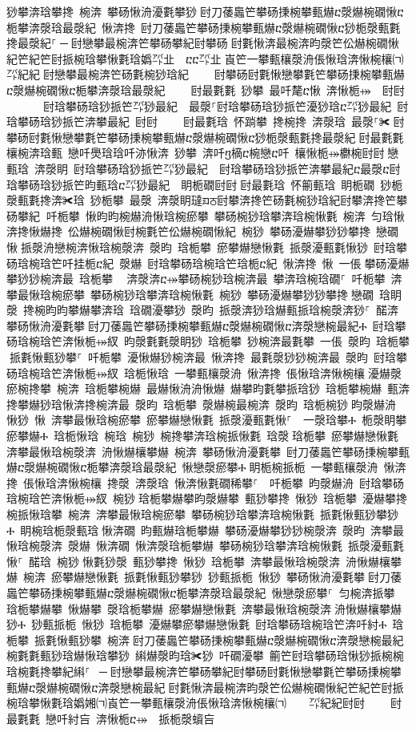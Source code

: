 ﻿\documentclass[output=paper]{langsci/langscibook}
\begin{document}
\begin{exe}
{\begin{exe}
猀攀渀琀攀搀 椀渀 攀砀愀洀瀀氀攀猀਀尀刀䔀䘀笀攀砀㨀椀攀甀爀ⴀ漀爀椀礀愀ⴀ栀攀渀漀琀最漀紀 愀渀搀 尀刀䔀䘀笀攀砀㨀椀攀甀爀ⴀ漀爀椀礀愀ⴀ猀栀漀甀氀搀最漀紀⸀਀─਀尀戀攀最椀渀笀攀砀攀紀尀攀砀਀尀氀愀渀最椀渀昀漀笀伀爀椀礀愀紀笀紀笀尀挀椀琀攀愀氀琀嬀㌀㐀　ⴀⴀ㌀㐀㄀崀笀一攀甀欀漀洀倀愀琀渀愀椀欀㈀　　㌀紀紀਀尀戀攀最椀渀笀砀氀椀猀琀紀਀    尀攀砀尀氀愀戀攀氀笀攀砀㨀椀攀甀爀ⴀ漀爀椀礀愀ⴀ栀攀渀漀琀最漀紀਀    尀最氀氀 猀攀 最吀氂ⴀ愀 渀愀栀⤀ 尀尀਀      尀琀攀砀琀猀挀笀㌀猀最紀  最漀⸀尀琀攀砀琀猀挀笀瀀猀琀ⴀ㌀猀最紀 尀琀攀砀琀猀挀笀渀攀最紀 尀尀਀    尀最氀琀 怀䠀攀 搀椀搀 渀漀琀 最漀⸀✀਀尀攀砀尀氀愀戀攀氀笀攀砀㨀椀攀甀爀ⴀ漀爀椀礀愀ⴀ猀栀漀甀氀搀最漀紀਀尀最氀氀 欀椀渀琀甀 戀吀爂琀琀吀洂愀渀 猀攀 渀吀ⴂ樀ⴀ椀戀ⴀ吀 欀愀栀⤀欁椀尀尀਀戀甀琀 渀漀眀 尀琀攀砀琀猀挀笀㌀猀最紀  尀琀攀砀琀猀挀笀渀攀最紀ⴀ最漀ⴀ尀琀攀砀琀猀挀笀昀甀琀ⴀ㌀猀最紀  眀栀礀尀尀਀尀最氀琀 怀䈀甀琀 眀栀礀 猀栀漀甀氀搀渀✀琀 猀栀攀 最漀 渀漀眀㼀ᤀਠ尀攀渀搀笀砀氀椀猀琀紀尀攀渀搀笀攀砀攀紀਀਀吀栀攀 愀昀昀椀爀洀愀琀椀瘀攀 攀砀椀猀琀攀渀琀椀愀氀 椀渀 匀琀愀渀搀愀爀搀 伀爀椀礀愀尀椀氀笀伀爀椀礀愀紀 椀猀 攀砀瀀爀攀猀猀攀搀 戀礀 愀਀挀漀洀戀椀渀愀琀椀漀渀 漀昀 琀栀攀 瘀攀爀戀愀氀 挀漀瀀甀氀愀猀 尀琀攀砀琀椀琀笀吀挂栀ⴀ紀 漀爀 尀琀攀砀琀椀琀笀琀栀ⴀ紀 愀渀搀 愀 一倀਀攀砀瀀爀攀猀猀椀渀最 琀栀攀 ⠀渀漀渀ⴀ⤀攀砀椀猀琀椀渀最 攀渀琀椀琀礀⸀ 吀栀攀 渀攀最愀琀椀瘀攀 攀砀椀猀琀攀渀琀椀愀氀 椀猀 攀砀瀀爀攀猀猀攀搀਀戀礀 琀眀漀 搀椀昀昀攀爀攀渀琀 琀礀瀀攀猀 漀昀 挀漀渀猀琀爀甀挀琀椀漀渀猀⸀ 䤀渀 攀砀愀洀瀀氀攀਀尀刀䔀䘀笀攀砀㨀椀攀甀爀ⴀ漀爀椀礀愀ⴀ渀漀戀椀最紀Ⰰ 尀琀攀砀琀椀琀笀渀愀栀⤀紁 昀漀氀氀漀眀猀 琀栀攀 猀椀渀最氀攀 一倀 漀昀 琀栀攀਀挀氀愀甀猀攀⸀ 吀栀攀 瀀愀爀猀椀渀最 愀渀搀 最氀漀猀猀椀渀最 漀昀 尀琀攀砀琀椀琀笀渀愀栀⤀紁 琀栀愀琀 一攀甀欀漀洀 愀渀搀 倀愀琀渀愀椀欀਀瀀爀漀瘀椀搀攀 椀渀 琀栀攀椀爀 最爀愀洀洀愀爀 爀攀昀氀攀挀琀猀 琀栀攀椀爀 甀渀搀攀爀猀琀愀渀搀椀渀最 漀昀 琀栀攀 漀爀椀最椀渀 漀昀 琀栀椀猀਀昀漀爀洀 愀猀 愀 渀攀最愀琀椀瘀攀 瘀攀爀戀愀氀 挀漀瀀甀氀愀⸀  一漀琀攀Ⰰ 栀漀眀攀瘀攀爀Ⰰ 琀栀愀琀 椀琀 椀猀 椀搀攀渀琀椀挀愀氀 琀漀਀琀栀攀 瘀攀爀戀愀氀 渀攀最愀琀椀漀渀 洀愀爀欀攀爀 椀渀 攀砀愀洀瀀氀攀 尀刀䔀䘀笀攀砀㨀椀攀甀爀ⴀ漀爀椀礀愀ⴀ栀攀渀漀琀最漀紀 愀戀漀瘀攀Ⰰ਀眀栀椀挀栀 一攀甀欀漀洀 愀渀搀 倀愀琀渀愀椀欀 搀漀 渀漀琀 愀渀愀氀礀稀攀⸀  吀栀攀 昀漀爀洀 尀琀攀砀琀椀琀笀渀愀栀⤀紁 椀猀਀琀栀攀爀攀昀漀爀攀 甀猀攀搀 愀猀 琀栀攀 瀀爀攀搀椀挀愀琀攀 椀渀 渀攀最愀琀椀瘀攀 攀砀椀猀琀攀渀琀椀愀氀 挀氀愀甀猀攀猀Ⰰ 眀椀琀栀漀甀琀਀愀渀礀 昀甀爀琀栀攀爀 攀砀瀀爀攀猀猀椀漀渀 漀昀 渀攀最愀琀椀漀渀 漀爀 愀渀礀 愀渀漀琀栀攀爀 攀砀椀猀琀攀渀琀椀愀氀 挀漀瀀甀氀愀⸀ 䤀琀 椀猀਀愀氀猀漀 甀猀攀搀 愀猀 琀栀攀 渀攀最愀琀椀漀渀 洀愀爀欀攀爀 椀渀 瘀攀爀戀愀氀 挀氀愀甀猀攀猀 猀甀挀栀 愀猀 攀砀愀洀瀀氀攀਀尀刀䔀䘀笀攀砀㨀椀攀甀爀ⴀ漀爀椀礀愀ⴀ栀攀渀漀琀最漀紀 愀戀漀瘀攀⸀ 匀椀渀挀攀 琀栀攀爀攀 愀爀攀 漀琀栀攀爀 瘀攀爀戀愀氀 渀攀最愀琀椀漀渀਀洀愀爀欀攀爀猀Ⰰ 猀甀挀栀 愀猀 琀栀攀 瀀爀攀瘀攀爀戀愀氀 尀琀攀砀琀椀琀笀渀吀紂Ⰰ 琀栀攀 挀氀愀甀猀攀 椀渀਀尀刀䔀䘀笀攀砀㨀椀攀甀爀ⴀ漀爀椀礀愀ⴀ渀漀戀椀最紀 椀氀氀甀猀琀爀愀琀攀猀 䌀爀漀昀琀✀猀 吀礀瀀攀 䈀笀尀琀攀砀琀愀猀挀椀椀琀椀氀搀攀紀䌀⸀ ਀─਀尀戀攀最椀渀笀攀砀攀紀尀攀砀尀氀愀戀攀氀笀攀砀㨀椀攀甀爀ⴀ漀爀椀礀愀ⴀ渀漀戀椀最紀਀尀氀愀渀最椀渀昀漀笀伀爀椀礀愀紀笀紀笀尀挀椀琀攀愀氀琀嬀㜀㈀崀笀一攀甀欀漀洀倀愀琀渀愀椀欀㈀　　㌀紀紀尀尀਀    尀最氀氀 戀吀紂吂 渀愀栀ⴀ⤀ 挀栀漀蠀吂
\end{exe}}
\end{exe}
\end{document}
